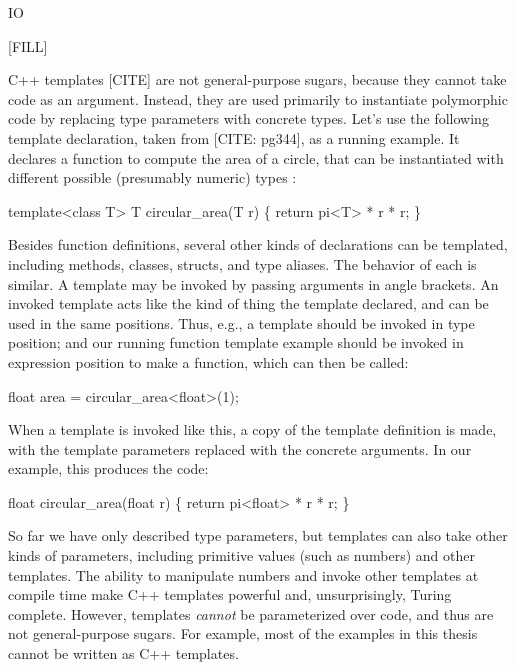  IO

 [FILL]

 C++ templates [CITE] are not general-purpose sugars,
because they cannot take code as an argument.  Instead, they are used
primarily to instantiate polymorphic code by replacing type parameters
with concrete types.  Let's use the following template declaration,
taken from [CITE: pg344], as a running example. It declares a function
to compute the area of a circle, that can be instantiated with
different possible (presumably numeric) types :
\begin{codes}
template<class T>
T circular_area(T r) \{
  return pi<T> * r * r;
\}
\end{codes}

Besides function definitions, several other kinds of declarations can
be templated, including methods, classes, structs, and type aliases.
The behavior of each is similar. A template may be invoked by passing
arguments in angle brackets. An invoked template acts like the
kind of thing the template declared, and can be used in the same
positions. Thus, e.g., a  template should be invoked in type
position; and our running function template example should be invoked
in expression position to make a function, which can then be called:
\begin{codes}
  float area = circular_area<float>(1);
\end{codes}
When a template is invoked like this, a copy of the template
definition is made, with the template parameters replaced with the
concrete arguments.
In our example, this produces the code:
\begin{codes}
float circular_area(float r) \{
  return pi<float> * r * r;
\}
\end{codes}

So far we have only described type parameters, but templates can also
take other kinds of parameters, including primitive values (such as
numbers) and other templates. The ability to manipulate numbers and
invoke other templates at compile time make C++ templates powerful
and, unsurprisingly, Turing complete. However, templates \emph{cannot}
be parameterized over code, and thus are not general-purpose sugars.
For example, most of the examples in this thesis cannot be written as
C++ templates.

